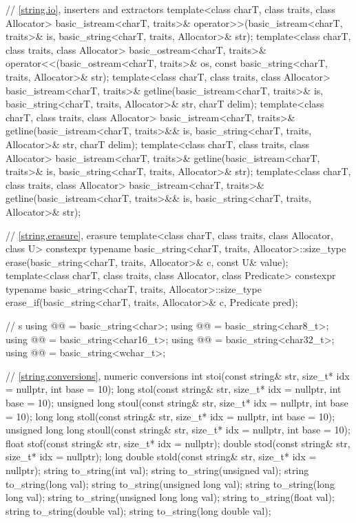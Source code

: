 \begin{codeblock}
{  // \ref{string.io}, inserters and extractors
  template<class charT, class traits, class Allocator>
    basic_istream<charT, traits>&
      operator>>(basic_istream<charT, traits>& is,
                 basic_string<charT, traits, Allocator>& str);
  template<class charT, class traits, class Allocator>
    basic_ostream<charT, traits>&
      operator<<(basic_ostream<charT, traits>& os,
                 const basic_string<charT, traits, Allocator>& str);
  template<class charT, class traits, class Allocator>
    basic_istream<charT, traits>&
      getline(basic_istream<charT, traits>& is,
              basic_string<charT, traits, Allocator>& str,
              charT delim);
  template<class charT, class traits, class Allocator>
    basic_istream<charT, traits>&
      getline(basic_istream<charT, traits>&& is,
              basic_string<charT, traits, Allocator>& str,
              charT delim);
  template<class charT, class traits, class Allocator>
    basic_istream<charT, traits>&
      getline(basic_istream<charT, traits>& is,
              basic_string<charT, traits, Allocator>& str);
  template<class charT, class traits, class Allocator>
    basic_istream<charT, traits>&
      getline(basic_istream<charT, traits>&& is,
              basic_string<charT, traits, Allocator>& str);

  // \ref{string.erasure}, erasure
  template<class charT, class traits, class Allocator, class U>
    constexpr typename basic_string<charT, traits, Allocator>::size_type
      erase(basic_string<charT, traits, Allocator>& c, const U& value);
  template<class charT, class traits, class Allocator, class Predicate>
    constexpr typename basic_string<charT, traits, Allocator>::size_type
      erase_if(basic_string<charT, traits, Allocator>& c, Predicate pred);

  //  s
  using @@    = basic_string<char>;
  using @@  = basic_string<char8_t>;
  using @@ = basic_string<char16_t>;
  using @@ = basic_string<char32_t>;
  using @@   = basic_string<wchar_t>;

  // \ref{string.conversions}, numeric conversions
  int stoi(const string& str, size_t* idx = nullptr, int base = 10);
  long stol(const string& str, size_t* idx = nullptr, int base = 10);
  unsigned long stoul(const string& str, size_t* idx = nullptr, int base = 10);
  long long stoll(const string& str, size_t* idx = nullptr, int base = 10);
  unsigned long long stoull(const string& str, size_t* idx = nullptr, int base = 10);
  float stof(const string& str, size_t* idx = nullptr);
  double stod(const string& str, size_t* idx = nullptr);
  long double stold(const string& str, size_t* idx = nullptr);
  string to_string(int val);
  string to_string(unsigned val);
  string to_string(long val);
  string to_string(unsigned long val);
  string to_string(long long val);
  string to_string(unsigned long long val);
  string to_string(float val);
  string to_string(double val);
  string to_string(long double val);

}
\end{codeblock}
